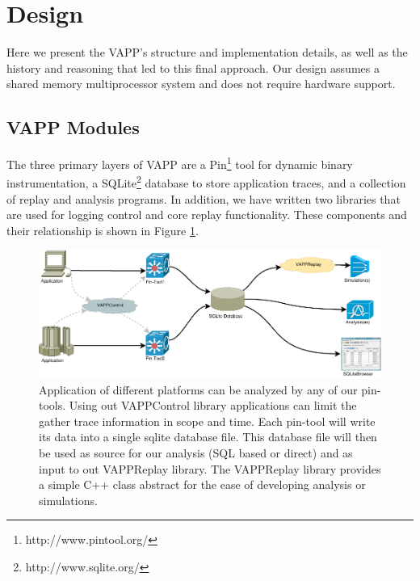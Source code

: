 \section{Design}
Here we present the VAPP's structure and implementation details,
as well as the history and reasoning that led to this final approach.
Our design assumes a shared memory multiprocessor system and does
not require hardware support.

\subsection{VAPP Modules}
The three primary layers of VAPP are a
Pin\footnote{http://www.pintool.org/} tool for dynamic binary
instrumentation, a SQLite\footnote{http://www.sqlite.org/} database to
store application traces, and a collection of replay and analysis
programs. In addition, we have written two libraries that are used for
logging control and core replay functionality. These components and
their relationship is shown in Figure \ref{fig:overview}.

\begin{figure}
  \begin{center}
  \includegraphics[width=.9\textwidth]{overview}
  \caption{Application of different platforms can be analyzed by any
    of our pin-tools. Using out VAPPControl library applications can
    limit the gather trace information in scope and time. Each
    pin-tool will write its data into a single sqlite database
    file. This database file will then be used as source for our
    analysis (SQL based or direct) and as input to out VAPPReplay
    library. The VAPPReplay library provides a simple C++ class
    abstract for the ease of developing analysis or simulations.}
  \label{fig:overview}
  \end{center}
\end{figure}

